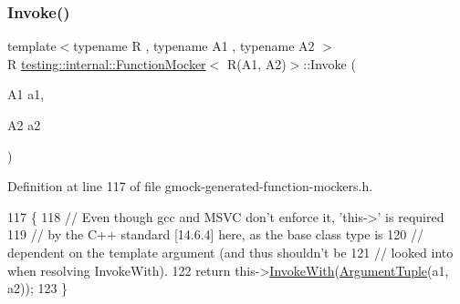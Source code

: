 \subsubsection{\texorpdfstring{Invoke()}{Invoke()}}
{\footnotesize\ttfamily template$<$typename R , typename A1 , typename A2 $>$ \\
R \hyperlink{classtesting_1_1internal_1_1FunctionMocker}{testing\+::internal\+::\+Function\+Mocker}$<$ R(A1, A2)$>$\+::Invoke (\begin{DoxyParamCaption}\item[{A1}]{a1,  }\item[{A2}]{a2 }\end{DoxyParamCaption})\hspace{0.3cm}{\ttfamily [inline]}}



Definition at line 117 of file gmock-\/generated-\/function-\/mockers.\+h.


\begin{DoxyCode}
117                          \{
118     \textcolor{comment}{// Even though gcc and MSVC don't enforce it, 'this->' is required}
119     \textcolor{comment}{// by the C++ standard [14.6.4] here, as the base class type is}
120     \textcolor{comment}{// dependent on the template argument (and thus shouldn't be}
121     \textcolor{comment}{// looked into when resolving InvokeWith).}
122     \textcolor{keywordflow}{return} this->\hyperlink{classtesting_1_1internal_1_1FunctionMockerBase_a869ec713f000b4e7829c660efc25e8cd}{InvokeWith}(\hyperlink{classtesting_1_1internal_1_1FunctionMocker_3_01R_07A1_00_01A2_08_4_ae75e3ba40a99224f7363681914212c19}{ArgumentTuple}(a1, a2));
123   \}
\end{DoxyCode}
\mbox{\label{classtesting_1_1internal_1_1FunctionMocker_3_01R_07A1_00_01A2_08_4_a7e17361fadc89120c1254826baa3200e}} 
